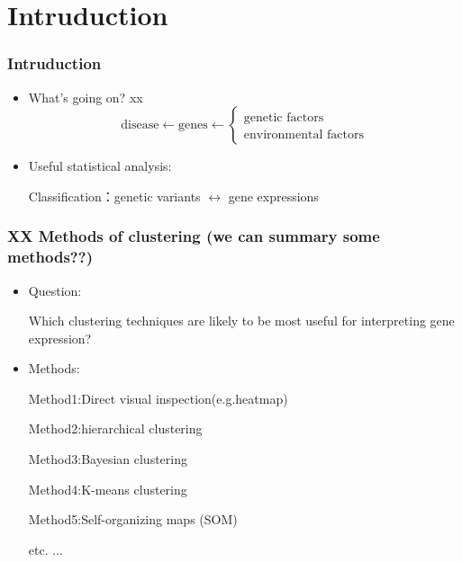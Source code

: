 \section{Intruduction}
\begin{frame}
\sectionpage
\end{frame}

\begin{frame}
    \frametitle{Intruduction}
    \begin{itemize}
      \item What's going on? xx
      \begin{equation*}
        \text{disease} \leftarrow 
        \text{genes} \leftarrow 
        \left\{ \begin{matrix} \text{genetic factors} \\ \text{environmental factors} \end{matrix} \right.
      \end{equation*}


      \item Useful statistical analysis:
      
      Classification：genetic variants $\leftrightarrow$ gene expressions

    \end{itemize}
\end{frame}


\begin{frame}
    \frametitle{ XX Methods of clustering (we can summary some methods??)}
    \begin{itemize}
      \item Question:
   
    Which clustering techniques are likely to be most useful for interpreting gene expression?

      \item Methods:
    
    Method1:Direct visual inspection(e.g.heatmap)

    Method2:hierarchical clustering
    
    Method3:Bayesian clustering
         
    Method4:K-means clustering
         
    Method5:Self-organizing maps (SOM)

    etc. ...
    \end{itemize}
\end{frame}
